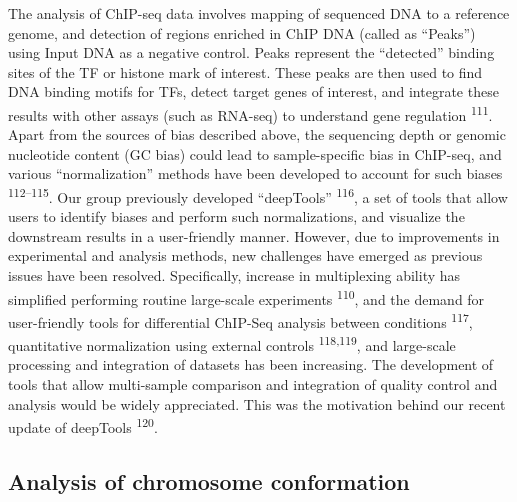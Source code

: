 \documentclass[11pt,twoside]{MPIthesis}
\theoremstyle{definition}
\theoremstyle{definition}
\theoremstyle{definition}
\theoremstyle{remark}
\begin{document}
The analysis of ChIP-seq data involves mapping of sequenced DNA to a
reference genome, and detection of regions enriched in ChIP DNA (called
as ``Peaks'') using Input DNA as a negative control. Peaks represent the
``detected'' binding sites of the TF or histone mark of interest. These
peaks are then used to find DNA binding motifs for TFs, detect target
genes of interest, and integrate these results with other assays (such
as RNA-seq) to understand gene regulation \textsuperscript{111}. Apart
from the sources of bias described above, the sequencing depth or
genomic nucleotide content (GC bias) could lead to sample-specific bias
in ChIP-seq, and various ``normalization'' methods have been developed
to account for such biases \textsuperscript{112--115}. Our group
previously developed ``deepTools'' \textsuperscript{116}, a set of tools
that allow users to identify biases and perform such normalizations, and
visualize the downstream results in a user-friendly manner. However, due
to improvements in experimental and analysis methods, new challenges
have emerged as previous issues have been resolved. Specifically,
increase in multiplexing ability has simplified performing routine
large-scale experiments \textsuperscript{110}, and the demand for
user-friendly tools for differential ChIP-Seq analysis between
conditions \textsuperscript{117}, quantitative normalization using
external controls \textsuperscript{118,119}, and large-scale processing
and integration of datasets has been increasing. The development of
tools that allow multi-sample comparison and integration of quality
control and analysis would be widely appreciated. This was the
motivation behind our recent update of deepTools \textsuperscript{120}.

\subsection{Analysis of chromosome
conformation}\label{analysis-of-chromosome-conformation}
\end{document}
